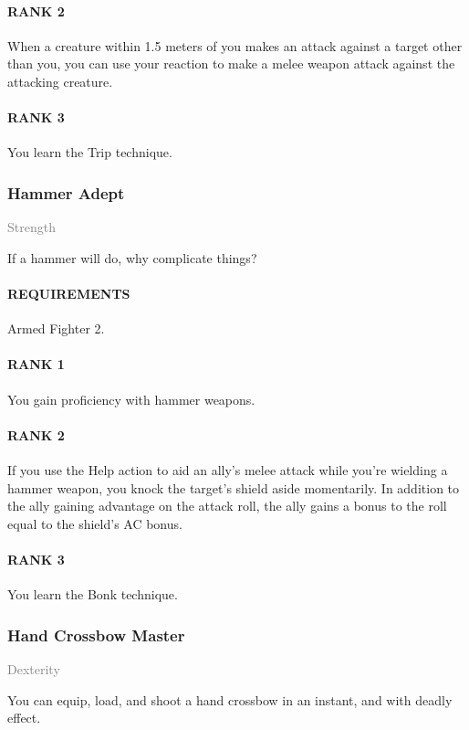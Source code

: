 \paragraph{RANK 2} When a creature within 1.5 meters of you makes an attack against a target other than you, you can use your reaction to make a melee weapon attack against the attacking creature.
\paragraph{RANK 3} You learn the Trip technique.

\subsubsection{Hammer Adept} \label{feat::hammeradept}
\small{\textcolor{gray}{Strength}}

\normalsize
If a hammer will do, why complicate things?
\paragraph{REQUIREMENTS} Armed Fighter 2.
\paragraph{RANK 1} You gain proficiency with hammer weapons.
\paragraph{RANK 2} If you use the Help action to aid an ally's melee attack while you're wielding a hammer weapon, you knock the target's shield aside momentarily.
In addition to the ally gaining advantage on the attack roll, the ally gains a bonus to the roll equal to the shield's AC bonus.
\paragraph{RANK 3} You learn the Bonk technique.

\subsubsection{Hand Crossbow Master} \label{feat::handcrossbowmaster}
\small{\textcolor{gray}{Dexterity}}

\normalsize
You can equip, load, and shoot a hand crossbow in an instant, and with deadly effect.

